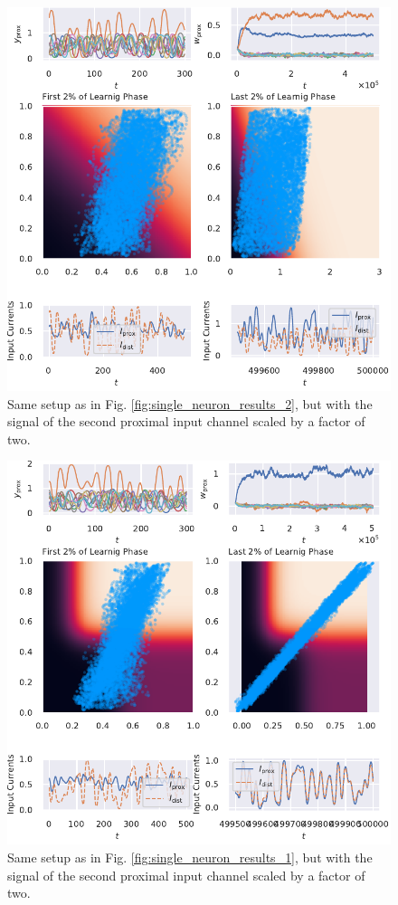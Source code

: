 \documentclass[10pt,a4paper]{article}
\begin{document}
\begin{figure}
\centering
\includegraphics[width=\textwidth]{./figures/fig3.pdf}
\caption{Same setup as in Fig. \ref{fig:single_neuron_results_2}, but with the signal of the second proximal input channel scaled by a factor of two.}
\label{fig:single_neuron_results_3}
\end{figure}

\begin{figure}
\centering
\includegraphics[width=\textwidth]{./figures/fig4.pdf}
\caption{Same setup as in Fig. \ref{fig:single_neuron_results_1}, but with the signal of the second proximal input channel scaled by a factor of two.}
\label{fig:single_neuron_results_4}
\end{figure}
\end{document}
